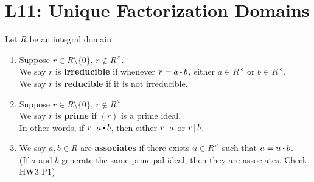 \documentclass[../Main.tex]{subfiles}
\begin{document}
\chapter{L11: Unique Factorization Domains}
\begin{dfn}[title = {Irreducible/Reducible, Prime, Associate Elements}]
	Let $R$ be an integral domain
	\begin{enumerate}
		\item Suppose $r\in R\setminus\{0\},\, r\notin R^\times$.\\
		We say $r$ is \textbf{irreducible} if whenever $r=a\rdot b$, either $a\in R^\times$ or $b\in R^\times$.\\
		We say $r$ is \textbf{reducible} if it is not irreducible.
		\item Suppose $r\in R\setminus\{0\},\, r\notin R^\times$\\
		We say $r$ is \textbf{prime} if $(r)$ is a prime ideal.\\
		In other words, if $\divs{r}{a\rdot b}$, then either $r \, | \, a$ or $r \, | \, b$.
		\item We say $a,b \in R$ are \textbf{associates} if there exists $u\in R^\times$ such that $a=u\rdot b$.\\ (If $a$ and $b$ generate the same principal ideal, then they are associates. Check HW3 P1)
	\end{enumerate}
\end{dfn}
\end{document}
